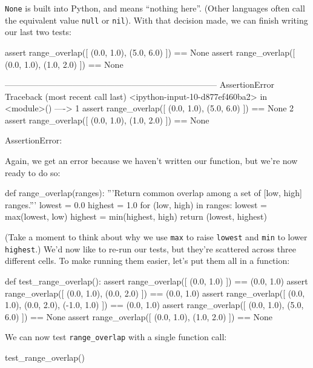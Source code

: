 \texttt{None} is built into Python, and means ``nothing here''. (Other
languages often call the equivalent value \texttt{null} or
\texttt{nil}). With that decision made, we can finish writing our last
two tests:

\begin{VerbIn}
assert range_overlap([ (0.0, 1.0), (5.0, 6.0) ]) == None
assert range_overlap([ (0.0, 1.0), (1.0, 2.0) ]) == None
\end{VerbIn}

\begin{VerbErr}
---------------------------------------------------------------------------
AssertionError                            Traceback (most recent call last)
<ipython-input-10-d877ef460ba2> in <module>()
----> 1 assert range_overlap([ (0.0, 1.0), (5.0, 6.0) ]) == None
      2 assert range_overlap([ (0.0, 1.0), (1.0, 2.0) ]) == None

AssertionError: 
\end{VerbErr}

Again, we get an error because we haven't written our function, but
we're now ready to do so:

\begin{VerbIn}
def range_overlap(ranges):
    '''Return common overlap among a set of [low, high] ranges.'''
    lowest = 0.0
    highest = 1.0
    for (low, high) in ranges:
        lowest = max(lowest, low)
        highest = min(highest, high)
    return (lowest, highest)
\end{VerbIn}

(Take a moment to think about why we use \texttt{max} to raise
\texttt{lowest} and \texttt{min} to lower \texttt{highest}.) We'd now
like to re-run our tests, but they're scattered across three different
cells. To make running them easier, let's put them all in a function:

\begin{VerbIn}
def test_range_overlap():
    assert range_overlap([ (0.0, 1.0) ]) == (0.0, 1.0)
    assert range_overlap([ (0.0, 1.0), (0.0, 2.0) ]) == (0.0, 1.0)
    assert range_overlap([ (0.0, 1.0), (0.0, 2.0), (-1.0, 1.0) ]) == (0.0, 1.0)
    assert range_overlap([ (0.0, 1.0), (5.0, 6.0) ]) == None
    assert range_overlap([ (0.0, 1.0), (1.0, 2.0) ]) == None
\end{VerbIn}

We can now test \texttt{range\_overlap} with a single function call:

\begin{VerbIn}
test_range_overlap()
\end{VerbIn}

